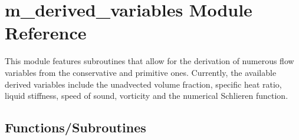 \hypertarget{namespacem__derived__variables}{}\section{m\+\_\+derived\+\_\+variables Module Reference}
\label{namespacem__derived__variables}


This module features subroutines that allow for the derivation of numerous flow variables from the conservative and primitive ones. Currently, the available derived variables include the unadvected volume fraction, specific heat ratio, liquid stiffness, speed of sound, vorticity and the numerical Schlieren function.  


\subsection*{Functions/\+Subroutines}
